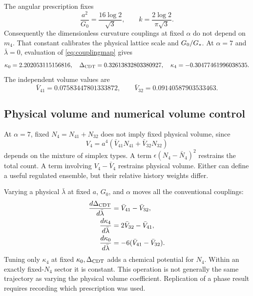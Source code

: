 The angular prescription fixes
\begin{equation}
\frac{a^2}{G_0}=\frac{16\log2}{\sqrt3},\qquad
k=\frac{2\log2}{\pi\sqrt3}.
\end{equation}
Consequently the dimensionless curvature couplings at fixed $\alpha$ do not depend on $m_4$. That constant calibrates the physical lattice scale and $G_0/G_*$. At $\alpha=7$ and $\bar\lambda=0$, evaluation of \eqref{eq:couplingmap} gives
\begin{equation}
\kappa_0=2.202053115156816,\quad
\Delta_{\rm CDT}=0.32613832803380927,\quad
\kappa_4=-0.30477461996038535.
\end{equation}
The independent volume values are
\begin{equation}
\bar V_{41}=0.07583447801333872,\qquad
\bar V_{32}=0.09140587903533463.
\end{equation}

\subsection{Physical volume and numerical volume control}

At $\alpha=7$, fixed $N_4=N_{41}+N_{32}$ does not imply fixed physical volume, since
\begin{equation}
V_4=a^4(\bar V_{41}N_{41}+\bar V_{32}N_{32})
\end{equation}
depends on the mixture of simplex types. A term $\epsilon(N_4-\bar N_4)^2$ restrains the total count. A term involving $V_4-\bar V_4$ restrains physical volume. Either can define a useful regulated ensemble, but their relative history weights differ.

Varying a physical $\bar\lambda$ at fixed $a$, $G_0$, and $\alpha$ moves all the conventional couplings:
\begin{align}
\frac{d\Delta_{\rm CDT}}{d\bar\lambda}
&=\bar V_{41}-\bar V_{32},\\
\frac{d\kappa_4}{d\bar\lambda}
&=2\bar V_{32}-\bar V_{41},\\
\frac{d\kappa_0}{d\bar\lambda}
&=-6(\bar V_{41}-\bar V_{32}).
\end{align}
Tuning only $\kappa_4$ at fixed $\kappa_0,\Delta_{\rm CDT}$ adds a chemical potential for $N_4$. Within an exactly fixed-$N_4$ sector it is constant. This operation is not generally the same trajectory as varying the physical volume coefficient. Replication of a phase result requires recording which prescription was used.

